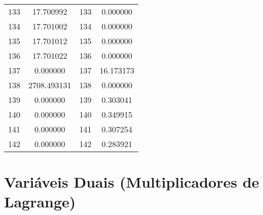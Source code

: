 \documentclass[12pt]{article}
\begin{document}
\begin{longtable}{@{}cccc@{}}
133 & 17.700992 & 133 & 0.000000 \\
134 & 17.701002 & 134 & 0.000000 \\
135 & 17.701012 & 135 & 0.000000 \\
136 & 17.701022 & 136 & 0.000000 \\
137 & 0.000000 & 137 & 16.173173 \\
138 & 2708.493131 & 138 & 0.000000 \\
139 & 0.000000 & 139 & 0.303041 \\
140 & 0.000000 & 140 & 0.349915 \\
141 & 0.000000 & 141 & 0.307254 \\
142 & 0.000000 & 142 & 0.283921 \\

\end{longtable}

\section{Variáveis Duais (Multiplicadores de Lagrange)}
\end{document}

